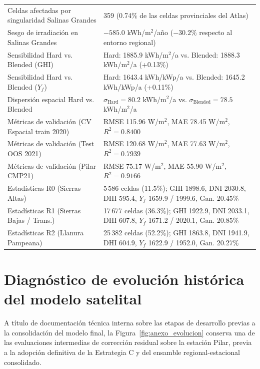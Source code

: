 \documentclass[11pt,a4paper]{article}
\begin{document}
\begin{longtable}{p{}p{}}
Celdas afectadas por singularidad Salinas Grandes & 359 (0.74\% de las celdas provinciales del Atlas) \\
Sesgo de irradiación en Salinas Grandes & $-585.0$ kWh/m$^2$/año ($-30.2\%$ respecto al entorno regional) \\
Sensibilidad Hard vs. Blended (GHI) & Hard: 1885.9 kWh/m$^2$/a vs. Blended: 1888.3 kWh/m$^2$/a (+0.13\%) \\
Sensibilidad Hard vs. Blended ($Y_f$) & Hard: 1643.4 kWh/kWp/a vs. Blended: 1645.2 kWh/kWp/a (+0.11\%) \\
Dispersión espacial Hard vs. Blended & $\sigma_{\mathrm{Hard}}=80.2$ kWh/m$^2$/a vs. $\sigma_{\mathrm{Blended}}=78.5$ kWh/m$^2$/a \\
Métricas de validación (CV Espacial train 2020) & RMSE 115.96 W/m$^2$, MAE 78.45 W/m$^2$, $R^2=0.8400$ \\
Métricas de validación (Test OOS 2021) & RMSE 120.68 W/m$^2$, MAE 77.63 W/m$^2$, $R^2=0.7939$ \\
Métricas de validación (Pilar CMP21) & RMSE 75.17 W/m$^2$, MAE 55.90 W/m$^2$, $R^2=0.9166$ \\
Estadísticas R0 (Sierras Altas) & 5\,586 celdas (11.5\%); GHI 1898.6, DNI 2030.8, DHI 595.4, $Y_f$ 1659.9 / 1999.6, Gan. 20.45\% \\
Estadísticas R1 (Sierras Bajas / Trans.) & 17\,677 celdas (36.3\%); GHI 1922.9, DNI 2033.1, DHI 607.8, $Y_f$ 1671.2 / 2020.1, Gan. 20.85\% \\
Estadísticas R2 (Llanura Pampeana) & 25\,382 celdas (52.2\%); GHI 1863.8, DNI 1941.9, DHI 604.9, $Y_f$ 1622.9 / 1952.0, Gan. 20.27\% \\
\bottomrule
\end{longtable}

\section{Diagnóstico de evolución histórica del modelo satelital}
\label{sec:anexo_evolucion}

A título de documentación técnica interna sobre las etapas de desarrollo previas a la consolidación del modelo final, la Figura~\ref{fig:anexo_evolucion} conserva una de las evaluaciones intermedias de corrección residual sobre la estación Pilar, previa a la adopción definitiva de la Estrategia C y del ensamble regional-estacional consolidado.
\end{document}
